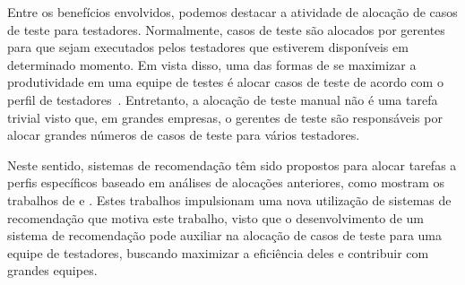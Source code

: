 Entre os benefícios envolvidos, podemos destacar a atividade de alocação de casos de teste para testadores.
Normalmente, casos de teste são alocados por gerentes para que sejam executados pelos testadores que estiverem disponíveis em determinado momento. Em vista disso, uma das formas de se maximizar a produtividade em uma equipe de testes é alocar casos de teste de acordo com o perfil de testadores~\cite{miranda2012recommender}. Entretanto, a alocação de teste manual não é uma tarefa trivial visto que,
em grandes empresas, o gerentes de teste são responsáveis por alocar grandes números de casos de teste para vários testadores.

Neste sentido, sistemas de recomendação têm sido propostos para alocar tarefas a perfis específicos baseado em análises de alocações anteriores, 
como mostram os trabalhos de \cite{anvik2006should} e \cite{miranda2012recommender}. Estes trabalhos impulsionam uma nova utilização de sistemas de recomendação que motiva este trabalho, visto que o desenvolvimento de um sistema de recomendação pode auxiliar na alocação de casos de teste para uma equipe de testadores, buscando maximizar a eficiência deles e contribuir com grandes equipes.
















